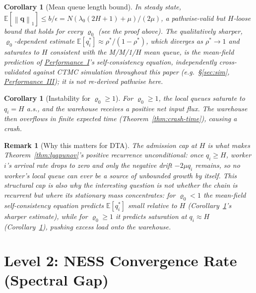 \documentclass[11pt,a4paper]{report}
\newtheorem{corollary}[theorem]{Corollary}
\newtheorem{remark}{Remark}[section]
\newcommand{\norm}[1]{\left\lVert #1 \right\rVert}
\newcommand{\rhostar}{\rho^{*}}
\newcommand{\rhozero}{\varrho_0}
\begin{document}
\begin{corollary}[Mean queue length bound]
\label{cor:mean-queue}
In steady state, $\mathbb{E}[\norm{\mathbf{q}}_1] \leq b/\epsilon =
N(\lambda_0(2H+1)+\mu)/(2\mu)$, a pathwise-valid but $H$-loose bound
that holds for every $\rhozero$ (see the proof above). The
qualitatively sharper, $\rhozero$-dependent estimate
$\mathbb{E}[q_i^*] \approx \rhostar/(1-\rhostar)$, which diverges as
$\rhostar \to 1$ and saturates to $H$ consistent with the M/M/1/$H$
mean queue, is the mean-field prediction of
\hyperref[chap:load_balance]{Performance~I}'s self-consistency
equation, independently cross-validated against CTMC simulation
throughout this paper (e.g.\ \S\ref{sec:sim},
\hyperref[chap:makespan]{Performance~III}); it is not re-derived
pathwise here.
\end{corollary}

\begin{corollary}[Instability for $\rhozero \geq 1$]
\label{cor:instability}
For $\rhozero \geq 1$, the local queues saturate to $q_i = H$ a.s.,
and the warehouse receives a positive net input flux.
The warehouse then overflows in finite expected time
(Theorem~\ref{thm:crash-time}), causing a crash.
\end{corollary}

\begin{remark}[Why this matters for DTA]
The admission cap at $H$ is what makes Theorem~\ref{thm:lyapunov}'s
positive recurrence unconditional: once $q_i \geq H$, worker $i$'s
arrival rate drops to zero and only the negative drift $-2\mu q_i$
remains, so no worker's local queue can ever be a source of unbounded
growth by itself. This structural cap is also why the interesting
question is not \emph{whether} the chain is recurrent but \emph{where}
its stationary mass concentrates: for $\rhozero<1$ the mean-field
self-consistency equation predicts $\mathbb{E}[q_i^*]$ small relative
to $H$ (Corollary~\ref{cor:mean-queue}'s sharper estimate), while for
$\rhozero\geq 1$ it predicts saturation at $q_i\approx H$
(Corollary~\ref{cor:instability}), pushing excess load onto the
warehouse.
\end{remark}

\section{Level 2: NESS Convergence Rate (Spectral Gap)}
\end{document}
